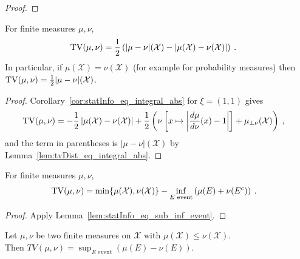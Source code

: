 \begin{proof}\mathlibok

\end{proof}


\begin{lemma}
  \label{lem:tv_eq_tvDist}
  \leanok
  For finite measures $\mu, \nu$,
  \begin{align*}
  \operatorname{TV}(\mu, \nu)
  &= \frac{1}{2} \left( \vert \mu - \nu \vert(\mathcal X) - \left\vert \mu(\mathcal X) - \nu(\mathcal X)\right\vert \right)
  \: .
  \end{align*}
  In particular, if $\mu(\mathcal X) = \nu(\mathcal X)$ (for example for probability measures) then $\operatorname{TV}(\mu, \nu) = \frac{1}{2} \vert \mu - \nu \vert(\mathcal X)$.
\end{lemma}

\begin{proof}\leanok
{}
Corollary~\ref{cor:statInfo_eq_integral_abs} for $\xi = (1,1)$ gives
\begin{align*}
\operatorname{TV}(\mu, \nu)
&= -\frac{1}{2} \left\vert \mu(\mathcal X) - \nu(\mathcal X)\right\vert + \frac{1}{2}\left( \nu\left[ x \mapsto \left\vert \frac{d \mu}{d\nu}(x) - 1 \right\vert \right]  + \mu_{\perp \nu}(\mathcal X)\right)
\: ,
\end{align*}
and the term in parentheses is $\vert \mu - \nu \vert(\mathcal X)$ by Lemma~\ref{lem:tvDist_eq_integral_abs}.
\end{proof}


\begin{lemma}
  \label{lem:tv_eq_sub_inf_event}
  For finite measures $\mu, \nu$,
  \begin{align*}
  \operatorname{TV}(\mu, \nu)
  &= \min\{\mu(\mathcal X), \nu(\mathcal X)\} - \inf_{E \text{ event}} \left( \mu(E) + \nu(E^c) \right)
  \: .
  \end{align*}
\end{lemma}

\begin{proof}%
{}
Apply Lemma~\ref{lem:statInfo_eq_sub_inf_event}.
\end{proof}


\begin{theorem}
  \label{thm:tv_eq_sup_sub_measure}
  \uses{}
  Let $\mu, \nu$ be two finite measures on $\mathcal X$ with $\mu(\mathcal X) \leq \nu(\mathcal X)$.\\
  Then $TV(\mu, \nu) = \sup_{E \text{ event}} \left( \mu(E) - \nu(E) \right)$.
\end{theorem}

